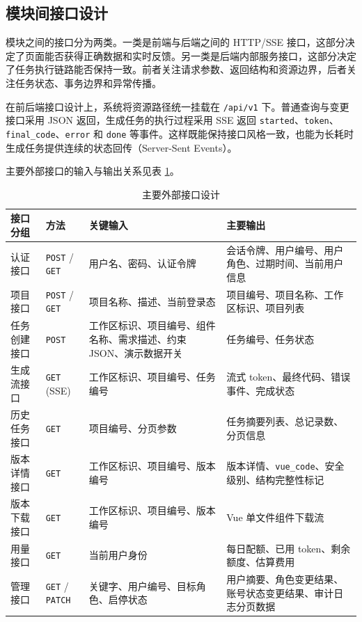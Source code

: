 \subsection{模块间接口设计}
模块之间的接口分为两类。一类是前端与后端之间的 HTTP/SSE 接口，这部分决定了页面能否获得正确数据和实时反馈。另一类是后端内部服务接口，这部分决定了任务执行链路能否保持一致。前者关注请求参数、返回结构和资源边界，后者关注任务状态、事务边界和异常传播。

在前后端接口设计上，系统将资源路径统一挂载在 \texttt{/api/v1} 下。普通查询与变更接口采用 JSON 返回，生成任务的执行过程采用 SSE 返回 \texttt{started}、\texttt{token}、\texttt{final\_code}、\texttt{error} 和 \texttt{done} 等事件。这样既能保持接口风格一致，也能为长耗时生成任务提供连续的状态回传（Server-Sent Events）\cite{w3c_eventsource}。

主要外部接口的输入与输出关系见表 \ref{tab:chapter4-api-design}。

\begin{table}[!htbp]
\centering
\caption{主要外部接口设计}
\label{tab:chapter4-api-design}
\small
\begin{tabular}{@{}p{}p{}p{}p{}@{}}
\toprule
接口分组 & 方法 & 关键输入 & 主要输出 \\
\midrule
认证接口 & \texttt{POST} / \texttt{GET} & 用户名、密码、认证令牌 & 会话令牌、用户编号、用户角色、过期时间、当前用户信息 \\
项目接口 & \texttt{POST} / \texttt{GET} & 项目名称、描述、当前登录态 & 项目编号、项目名称、工作区标识、项目列表 \\
任务创建接口 & \texttt{POST} & 工作区标识、项目编号、组件名称、需求描述、约束 JSON、演示数据开关 & 任务编号、任务状态 \\
生成流接口 & \texttt{GET} (SSE) & 工作区标识、项目编号、任务编号 & 流式 token、最终代码、错误事件、完成状态 \\
历史任务接口 & \texttt{GET} & 项目编号、分页参数 & 任务摘要列表、总记录数、分页信息 \\
版本详情接口 & \texttt{GET} & 工作区标识、项目编号、版本编号 & 版本详情、\texttt{vue\_code}、安全级别、结构完整性标记 \\
版本下载接口 & \texttt{GET} & 工作区标识、项目编号、版本编号 & Vue 单文件组件下载流 \\
用量接口 & \texttt{GET} & 当前用户身份 & 每日配额、已用 token、剩余额度、估算费用 \\
管理接口 & \texttt{GET} / \texttt{PATCH} & 关键字、用户编号、目标角色、启停状态 & 用户摘要、角色变更结果、账号状态变更结果、审计日志分页数据 \\
\bottomrule
\end{tabular}
\end{table}

